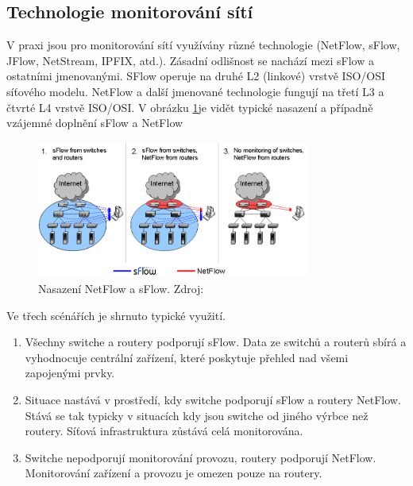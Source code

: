 \documentclass[thesis=M,czech]{FITthesis}[2012/06/26]
\begin{document}
\subsection{Technologie monitorování sítí}
V praxi jsou pro monitorování sítí využívány různé technologie (NetFlow, sFlow, JFlow, NetStream, IPFIX, atd.). Zásadní odlišnost se nachází mezi sFlow a ostatními jmenovanými. SFlow operuje na druhé L2 (linkové) vrstvě ISO/OSI síťového modelu. NetFlow a další jmenované technologie fungují na třetí L3 a čtvrté L4 vrstvě ISO/OSI.\cite{flowtechnology} V obrázku \ref{img:netflow_sflow}je vidět typické nasazení a případně vzájemné doplnění sFlow a NetFlow
\begin{figure}[!htbp]\centering	
	\includegraphics[width=0.8\textwidth]{sflownetflow.PNG}
	\caption[Nasazení NetFlow a sFlow. Zdroj: \cite{flowtechnology}]{Nasazení NetFlow a sFlow. Zdroj: \cite{flowtechnology}}
	\label{img:netflow_sflow}
\end{figure}
Ve třech scénářích je shrnuto typické využití.\cite{flowtechnology}
\begin{enumerate}
	\item Všechny switche a routery podporují sFlow. Data ze switchů a routerů sbírá a vyhodnocuje centrální zařízení, které poskytuje přehled nad všemi zapojenými prvky.
	\item Situace nastává v prostředí, kdy switche podporují sFlow a routery NetFlow. Stává se tak typicky v situacích kdy jsou switche od jiného výrbce než routery. Síťová infrastruktura zůstává celá monitorována.
	\item Switche nepodporují monitorování provozu, routery podporují NetFlow. Monitorování zařízení a provozu je omezen pouze na routery.
\end{enumerate}
\end{document}
